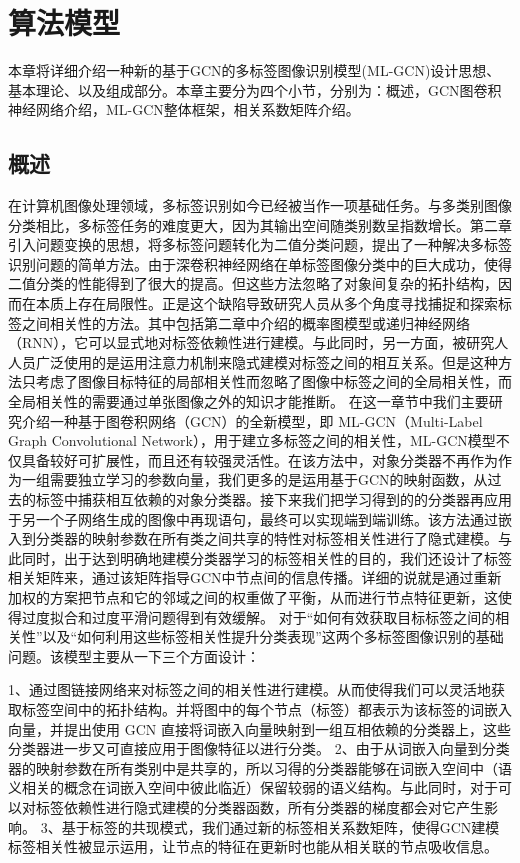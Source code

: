 \chapter{算法模型}

本章将详细介绍一种新的基于GCN的多标签图像识别模型(ML-GCN)设计思想、基本理论、以及组成部分。本章主要分为四个小节，分别为：概述，GCN图卷积神经网络介绍，ML-GCN整体框架，相关系数矩阵介绍。

\section{概述}

在计算机图像处理领域，多标签识别如今已经被当作一项基础任务。与多类别图像分类相比，多标签任务的难度更大，因为其输出空间随类别数呈指数增长。第二章引入问题变换的思想，将多标签问题转化为二值分类问题，提出了一种解决多标签识别问题的简单方法。由于深卷积神经网络在单标签图像分类中的巨大成功，使得二值分类的性能得到了很大的提高。但这些方法忽略了对象间复杂的拓扑结构，因而在本质上存在局限性。正是这个缺陷导致研究人员从多个角度寻找捕捉和探索标签之间相关性的方法。其中包括第二章中介绍的概率图模型或递归神经网络（RNN），它可以显式地对标签依赖性进行建模。与此同时，另一方面，被研究人人员广泛使用的是运用注意力机制来隐式建模对标签之间的相互关系。但是这种方法只考虑了图像目标特征的局部相关性而忽略了图像中标签之间的全局相关性，而全局相关性的需要通过单张图像之外的知识才能推断。
在这一章节中我们主要研究介绍一种基于图卷积网络（GCN）的全新模型，即 ML-GCN（Multi-Label Graph Convolutional Network），用于建立多标签之间的相关性，ML-GCN模型不仅具备较好可扩展性，而且还有较强灵活性。在该方法中，对象分类器不再作为作为一组需要独立学习的参数向量，我们更多的是运用基于GCN的映射函数，从过去的标签中捕获相互依赖的对象分类器。接下来我们把学习得到的的分类器再应用于另一个子网络生成的图像中再现语句，最终可以实现端到端训练。该方法通过嵌入到分类器的映射参数在所有类之间共享的特性对标签相关性进行了隐式建模。与此同时，出于达到明确地建模分类器学习的标签相关性的目的，我们还设计了标签相关矩阵来，通过该矩阵指导GCN中节点间的信息传播。详细的说就是通过重新加权的方案把节点和它的邻域之间的权重做了平衡，从而进行节点特征更新，这使得过度拟合和过度平滑问题得到有效缓解。
对于“如何有效获取目标标签之间的相关性”以及“如何利用这些标签相关性提升分类表现”这两个多标签图像识别的基础问题。该模型主要从一下三个方面设计：

1、通过图链接网络来对标签之间的相关性进行建模。从而使得我们可以灵活地获取标签空间中的拓扑结构。并将图中的每个节点（标签）都表示为该标签的词嵌入向量，并提出使用 GCN 直接将词嵌入向量映射到一组互相依赖的分类器上，这些分类器进一步又可直接应用于图像特征以进行分类。
2、由于从词嵌入向量到分类器的映射参数在所有类别中是共享的，所以习得的分类器能够在词嵌入空间中（语义相关的概念在词嵌入空间中彼此临近）保留较弱的语义结构。与此同时，对于可以对标签依赖性进行隐式建模的分类器函数，所有分类器的梯度都会对它产生影响。
3、基于标签的共现模式，我们通过新的标签相关系数矩阵，使得GCN建模标签相关性被显示运用，让节点的特征在更新时也能从相关联的节点吸收信息。


